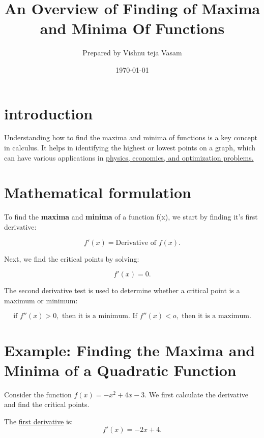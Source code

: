 \documentclass{article}
\title{An Overview of Finding of Maxima and Minima Of Functions}
\author{Prepared by Vishnu teja Vasam}
\date{\today}
\begin{document}
\maketitle
\tableofcontents\newpage
\section{introduction}

Understanding how to find the maxima and minima of functions is a key concept
in calculus. It helps in identifying the highest or lowest points on a graph, which
can have various applications in \underline{physics, economics, and optimization problems.}\\
\newpage
\section{Mathematical formulation}

To find the \textbf{maxima} and \textbf{minima} of a function f(x), we start by finding it's first derivative:
\begin{center}
    \begin{equation}
        f'(x) = \text{Derivative of } f(x).
    \end{equation}
\end{center}
    Next, we find the critical points by solving:
\begin{center}
    \begin{equation}
        f'(x) = 0.
    \end{equation}
\end{center}

    The second derivative test is used to determine whether a critical point is a maximum or minimum:

\begin{center}
    \begin{equation}
        \text{if }f''(x) > 0,\text{ then it is a minimum. If }f''(x)<o, \text{ then it is a maximum.}
    \end{equation}
\end{center}
\newpage
\section{ Example: Finding the Maxima and Minima of a Quadratic Function}
Consider the function $f(x) = -x^2 + 4x - 3$. We first calculate the derivative and find the critical points.

The \underline{first derivative} is: 
\[f'(x) = -2x + 4.\]
\end{document}
